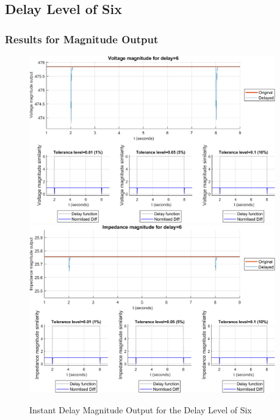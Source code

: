 \subsection{Delay Level of Six}
\subsubsection{Results for Magnitude Output}

\begin{figure}
    \caption{Instant Delay Magnitude Output for the Delay Level of Six}
    \includegraphics[width=0.95\textwidth]{PMUsim-figures/DelayOf_6/Instant_vMagnitude.png}    
      \includegraphics[width=0.95\textwidth]{PMUsim-figures/DelayOf_6/Instant_iMagnitude.png}       \label{fig:PMUsim_Six_Magnitude}
    \begin{small}
     \end{small}
\end{figure}

